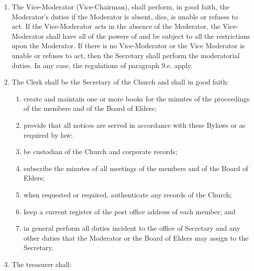 \documentclass[
]{book}
\providecommand{\tightlist}{%
  \setlength{\itemsep}{0pt}\setlength{\parskip}{0pt}}
\begin{document}
\begin{enumerate}
\item
  The Vice-Moderator (Vice-Chairman), shall perform, in good faith, the Moderator's duties if the Moderator is absent, dies, is unable or refuses to act. If the Vice-Moderator acts in the absence of the Moderator, the Vice-Moderator shall have all of the powers of and be subject to all the restrictions upon the Moderator. If there is no Vice-Moderator or the Vice Moderator is unable or refuses to act, then the Secretary shall perform the moderatorial duties. In any case, the regulations of paragraph 9.e. apply.
\item
  The Clerk shall be the Secretary of the Church and shall in good faith:

  \begin{enumerate}
  \def\labelenumii{(\arabic{enumii})}
  \tightlist
  \item
    create and maintain one or more books for the minutes of the proceedings of the members and of the Board of Elders;
  \item
    provide that all notices are served in accordance with these Bylaws or as required by law;
  \item
    be custodian of the Church and corporate records;
  \item
    subscribe the minutes of all meetings of the members and of the Board of Elders;
  \item
    when requested or required, authenticate any records of the Church;
  \item
    keep a current register of the post office address of each member; and
  \item
    in general perform all duties incident to the office of Secretary and any other duties that the Moderator or the Board of Elders may assign to the Secretary.
  \end{enumerate}
\item
  The treasurer shall:


\end{enumerate}
\end{document}
